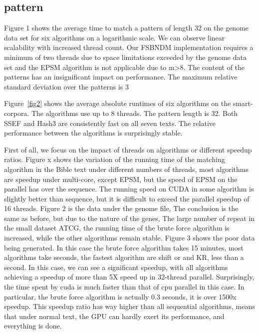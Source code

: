 \documentclass[11pt]{article}       %
\begin{document}
\subsection{pattern}\label{pf}

Figure 1 shows the average time to match a pattern of length 32 on the genome data set for six algorithms on a logarithmic scale. We can observe linear scalability with increased thread count. Our FSBNDM implementation requires a minimum of two threads due to space limitations exceeded by the genome data set and the EPSM algorithm is not applicable due to m>8. The content of the patterns has an insignificant impact on performance. The maximum relative standard deviation over the patterns is 3%



 Figure~\ref{fig2} shows the average absolute runtimes of six algorithms on the smart-corpora. The algorithms use up to 8 threads. The pattern length is 32. Both SSEF and Hash3 are consistently fast on all seven texts. The relative performance between the algorithms is surprisingly stable.


First of all, we focus on the impact of threads on algorithms or different speedup ratios. Figure x shows the variation of the running time of the matching algorithm in the Bible text under different numbers of threads, most algorithms are speedup under multi-core, except EPSM, but the speed of EPSM on the parallel has over the sequence. The running speed on CUDA in some algorithm is slightly better than sequence, but it is difficult to exceed the parallel speedup of 16 threads. Figure 2 is the data under the genome file, The conclusion is the same as before, but due to the nature of the genes, The large number of repeat in the small dataset {ATCG}, the running time of the brute force algorithm is increased, while the other algorithms remain stable. Figure 3 shows the poor data being generated. In this case the brute force algorithm takes 15 minutes, most algorithms take seconds, the fastest algorithm are shift or and KR, less than a second. In this case, we can see a significant speedup, with all algorithms achieving a speedup of more than 5X speed up in 32-thread parallel. Surprisingly, the time spent by cuda is much faster than that of cpu parallel in this case. In particular, the brute force algorithm is actually 0.3 seconds, it is over 1500x speedup. This speedup ratio has way higher than all sequential algorithms, means that under normal text, the GPU can hardly exert its performance, and everything is done.
\end{document}
